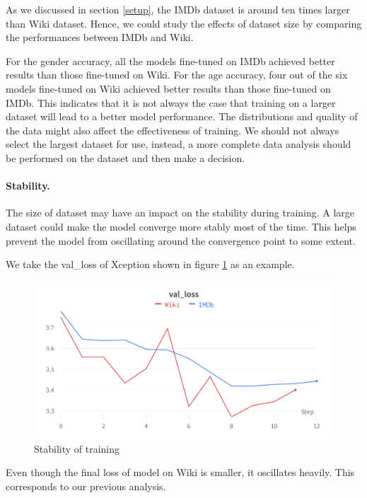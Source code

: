 \documentclass[DIV=calc, paper=a4, fontsize=10pt, twocolumn]{article}
\begin{document}
	As we discussed in section \ref{setup}, the IMDb dataset is around ten times larger than Wiki dataset. Hence, we could study the effects of dataset size by comparing the performances between IMDb and Wiki.
	
	For the gender accuracy, all the models fine-tuned on IMDb achieved better results than those fine-tuned on Wiki. For the age accuracy, four out of the six models fine-tuned on Wiki achieved better results than those fine-tuned on IMDb. This indicates that it is not always the case that training on a larger dataset will lead to a better model performance. The distributions and quality of the data might also affect the effectiveness of training. We should not always select the largest dataset for use, instead, a more complete data analysis should be performed on the dataset and then make a decision.
	
	\paragraph{Stability.} The size of dataset may have an impact on the stability during training. A large dataset could make the model converge more stably most of the time. This helps prevent the model from oscillating around the convergence point to some extent.
	
	We take the val\_loss of Xception shown in figure \ref{fig:oscillation} as an example.
	
	\begin{figure}[H]
		\centering
		\includegraphics[width=0.7\linewidth]{imgs/oscillation}
		\caption{Stability of training}
		\label{fig:oscillation}
	\end{figure}
	
	Even though the final loss of model on Wiki is smaller, it oscillates heavily. This corresponds to our previous analysis.
	
\end{document}
